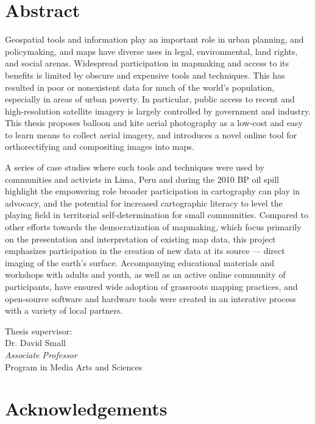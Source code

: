 \documentclass[11pt,oneside,notitlepage]{report}
\begin{document}
\normalsize{
\section*{Abstract}
Geospatial tools and information play an important role in urban planning, and policymaking, and maps have diverse uses in legal, environmental, land rights, and social arenas. Widespread participation in mapmaking and access to its benefits is limited by obscure and expensive tools and techniques. This has resulted in poor or nonexistent data for much of the world's population, especially in areas of urban poverty. In particular, public access to recent and high-resolution satellite imagery is largely controlled by government and industry. This thesis proposes balloon and kite aerial photography as a low-cost and easy to learn means to collect aerial imagery, and introduces a novel online tool for orthorectifying and compositing images into maps. 

A series of case studies where such tools and techniques were used by communities and activists in Lima, Peru and during the 2010 BP oil spill highlight the empowering role broader participation in cartography can play in advocacy, and the potential for increased cartographic literacy to level the playing field in territorial self-determination for small communities. Compared to other efforts towards the democratization of mapmaking, which focus primarily on the presentation and interpretation of existing map data, this project emphasizes participation in the creation of new data at its source --- direct imaging of the earth's surface. Accompanying educational materials and workshops with adults and youth, as well as an active online community of participants, have ensured wide adoption of grassroots mapping practices, and open-source software and hardware tools were created in an interative process with a variety of local partners.  
}

\vspace{20px}
\large{
Thesis supervisor:\\
Dr. David Small\\
\emph{Associate Professor}\\
Program in Media Arts and Sciences\\
}

\pagebreak

\normalsize{
\section*{Acknowledgements}
}
\end{document}
